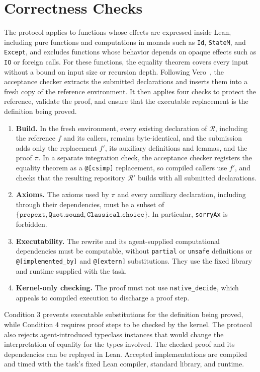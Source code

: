 \section{Correctness Checks}
\label{app:acceptance}

The protocol applies to functions whose effects are expressed inside Lean, including pure functions and computations in monads such as \texttt{Id}, \texttt{StateM}, and \texttt{Except}, and excludes functions whose behavior depends on opaque effects such as \texttt{IO} or foreign calls.
For these functions, the equality theorem covers every input without a bound on input size or recursion depth.
Following Vero~\citep{ye2026vero}, the acceptance checker extracts the submitted declarations and inserts them into a fresh copy of the reference environment.
It then applies four checks to protect the reference, validate the proof, and ensure that the executable replacement is the definition being proved.
\begin{enumerate}[leftmargin=*]
\item \textbf{Build.} In the fresh environment, every existing declaration of $\mathcal{R}$, including the reference $f$ and its callers, remains byte-identical, and the submission adds only the replacement $f'$, its auxiliary definitions and lemmas, and the proof $\pi$. In a separate integration check, the acceptance checker registers the equality theorem as a \texttt{@[csimp]} replacement, so compiled callers use $f'$, and checks that the resulting repository $\mathcal{R}'$ builds with all submitted declarations.
\item \textbf{Axioms.} The axioms used by $\pi$ and every auxiliary declaration, including through their dependencies, must be a subset of $\{\texttt{propext}, \texttt{Quot.sound}, \texttt{Classical.choice}\}$. In particular, \texttt{sorryAx} is forbidden.
\item \textbf{Executability.} The rewrite and its agent-supplied computational dependencies must be computable, without \texttt{partial} or \texttt{unsafe} definitions or \texttt{@[implemented\_by]} and \texttt{@[extern]} substitutions. They use the fixed library and runtime supplied with the task.
\item \textbf{Kernel-only checking.} The proof must not use \texttt{native\_decide}, which appeals to compiled execution to discharge a proof step.
\end{enumerate}
Condition 3 prevents executable substitutions for the definition being proved, while Condition 4 requires proof steps to be checked by the kernel.
The protocol also rejects agent-introduced typeclass instances that would change the interpretation of equality for the types involved.
The checked proof and its dependencies can be replayed in Lean.
Accepted implementations are compiled and timed with the task's fixed Lean compiler, standard library, and runtime.


